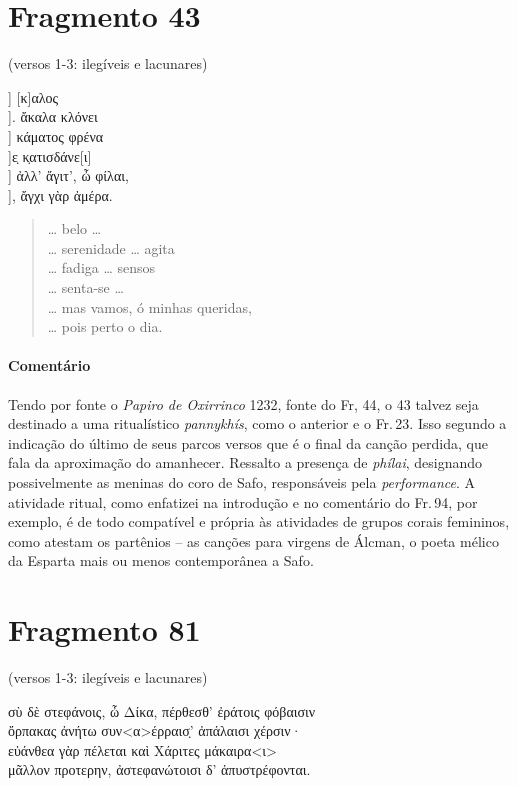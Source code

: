 \pagebreak
\section{Fragmento 43} 

\begin{gkverse}
\textnormal{(versos 1-3: ilegíveis e lacunares)}

] [κ]αλος\\
         ]. ἄκαλα κλόνει\\
         ] κάματος φρένα\\
       ]ε̣ κ̣ατισδάνε[ι]\\
       ] ἀλλ’ ἄγιτ’, ὦ φίλαι,\\
       ], ἄγχι γὰρ ἀμέρα.
\end{gkverse}

\begin{verse}
\ldots{} belo \ldots{}\\
\ldots{} serenidade \ldots{} agita\\
\ldots{} fadiga \ldots{} sensos\\
\ldots{} senta-se \ldots{}\\
\ldots{} mas vamos, ó minhas queridas,\\
\ldots{} pois perto o dia.
\end{verse}

{\paragraph{Comentário} Tendo por fonte o \textit{Papiro de Oxirrinco} 1232, fonte do Fr, 44, o 43 talvez seja destinado a uma  ritualístico \textit{pannykhís}, como o anterior e o Fr.\,23. Isso segundo a indicação do último de seus parcos versos que é o final da canção perdida, que fala da aproximação do amanhecer. Ressalto a presença de \textit{phílai}, designando possivelmente as meninas do coro de Safo, responsáveis pela \textit{performance}. A atividade ritual, como enfatizei na introdução e no comentário do Fr.\,94, por exemplo, é de todo compatível e própria às atividades de grupos corais femininos, como atestam os partênios -- as canções para virgens de Álcman, o poeta mélico da Esparta mais ou menos contemporânea a Safo.}


\pagebreak
\section{Fragmento 81}

\begin{gkverse}
\textnormal{(versos 1-3: ilegíveis e lacunares)}

σὺ δὲ στεφάνοις, ὦ Δίκα, πέρθεσθ’ ἐράτοις φόβαισιν\\
ὄρπακας ἀνήτω συν<α>έρραισ̣’ ἀπάλαισι χέρσιν·\\
εὐάνθεα \dagger{}γὰρ πέλεται\dagger{} καὶ Χάριτες μάκαιρα<ι>\\
μᾶλλον \dagger{}προτερην\dagger{}, ἀστεφανώτοισι δ’ ἀπυστρέφονται.
\end{gkverse}

